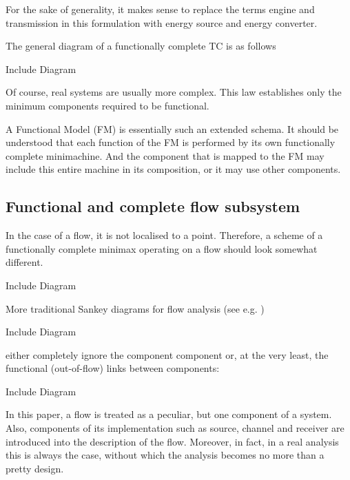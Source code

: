 \documentclass[a4paper,11pt]{article}
\begin{document}
For the sake of generality, it makes sense to replace the terms engine and
transmission in this formulation with energy source and energy converter.

The general diagram of a functionally complete TC is as follows
\begin{center}
  Include Diagram
\end{center}

Of course, real systems are usually more complex. This law establishes only
the minimum components required to be functional.

A Functional Model (FM) is essentially such an extended schema. It should be
understood that each function of the FM is performed by its own functionally
complete minimachine. And the component that is mapped to the FM may include
this entire machine in its composition, or it may use other components.

\subsection{Functional and complete flow subsystem}

In the case of a flow, it is not localised to a point. Therefore, a scheme of
a functionally complete minimax operating on a flow should look somewhat
different.
\begin{center}
  Include Diagram
\end{center}
More traditional Sankey diagrams for flow analysis (see e.g. \cite{B12})
\begin{center}
  Include Diagram
\end{center}
either completely ignore the component component or, at the very least, the
functional (out-of-flow) links between components:
\begin{center}
  Include Diagram
\end{center}
In this paper, a flow is treated as a peculiar, but one component of a
system. Also, components of its implementation such as source, channel and
receiver are introduced into the description of the flow. Moreover, in fact,
in a real analysis this is always the case, without which the analysis becomes
no more than a pretty design.
\end{document}
